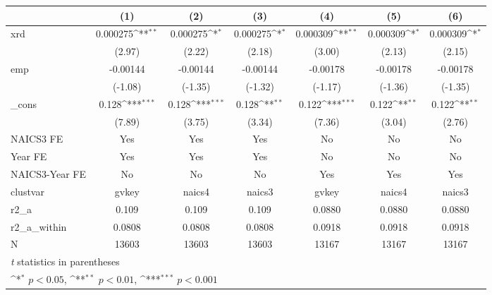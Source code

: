{
\def\sym#1{\ifmmode^{#1}\else\(^{#1}\)\fi}
\begin{tabular}{l*{6}{c}}
\hline\hline
            &\multicolumn{1}{c}{(1)}         &\multicolumn{1}{c}{(2)}         &\multicolumn{1}{c}{(3)}         &\multicolumn{1}{c}{(4)}         &\multicolumn{1}{c}{(5)}         &\multicolumn{1}{c}{(6)}         \\
\hline
xrd         &    0.000275\sym{**} &    0.000275\sym{*}  &    0.000275\sym{*}  &    0.000309\sym{**} &    0.000309\sym{*}  &    0.000309\sym{*}  \\
            &      (2.97)         &      (2.22)         &      (2.18)         &      (3.00)         &      (2.13)         &      (2.15)         \\
[1em]
emp         &    -0.00144         &    -0.00144         &    -0.00144         &    -0.00178         &    -0.00178         &    -0.00178         \\
            &     (-1.08)         &     (-1.35)         &     (-1.32)         &     (-1.17)         &     (-1.36)         &     (-1.35)         \\
[1em]
\_cons      &       0.128\sym{***}&       0.128\sym{***}&       0.128\sym{**} &       0.122\sym{***}&       0.122\sym{**} &       0.122\sym{**} \\
            &      (7.89)         &      (3.75)         &      (3.34)         &      (7.36)         &      (3.04)         &      (2.76)         \\
[1em]
NAICS3 FE   &         Yes         &         Yes         &         Yes         &          No         &          No         &          No         \\
[1em]
Year FE     &         Yes         &         Yes         &         Yes         &          No         &          No         &          No         \\
[1em]
NAICS3-Year FE&          No         &          No         &          No         &         Yes         &         Yes         &         Yes         \\
\hline
clustvar    &       gvkey         &      naics4         &      naics3         &       gvkey         &      naics4         &      naics3         \\
r2\_a        &       0.109         &       0.109         &       0.109         &      0.0880         &      0.0880         &      0.0880         \\
r2\_a\_within &      0.0808         &      0.0808         &      0.0808         &      0.0918         &      0.0918         &      0.0918         \\
N           &       13603         &       13603         &       13603         &       13167         &       13167         &       13167         \\
\hline\hline
\multicolumn{7}{l}{\footnotesize \textit{t} statistics in parentheses}\\
\multicolumn{7}{l}{\footnotesize \sym{*} \(p<0.05\), \sym{**} \(p<0.01\), \sym{***} \(p<0.001\)}\\
\end{tabular}
}
